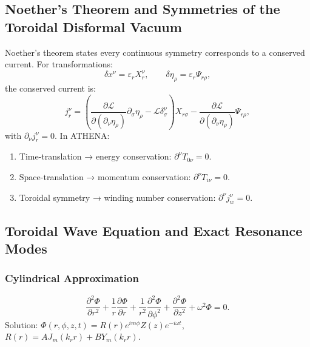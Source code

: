\documentclass[12pt, a4paper]{article}
\begin{document}
\subsection{Noether's Theorem and Symmetries of the Toroidal Disformal Vacuum}
\label{sec:noether}
Noether's theorem states every continuous symmetry corresponds to a conserved current. For transformations:
\begin{equation}
\delta x^\nu = \varepsilon_r X_r^\nu, \qquad \delta \eta_\rho = \varepsilon_r \Psi_{r\rho},
\label{eq:noether_trans}
\end{equation}
the conserved current is:
\begin{equation}
j_r^\nu = \left( \frac{\partial \mathcal{L}}{\partial(\partial_\nu \eta_\rho)} \partial_\sigma \eta_\rho - \mathcal{L} \delta_\sigma^\nu \right) X_{r\sigma} - \frac{\partial \mathcal{L}}{\partial(\partial_\nu \eta_\rho)} \Psi_{r\rho},
\label{eq:noether_current}
\end{equation}
with $\partial_\nu j_r^\nu = 0$. In ATHENA:
\begin{enumerate}
    \item Time-translation → energy conservation: $\partial^\nu T_{0\nu} = 0$.
    \item Space-translation → momentum conservation: $\partial^\nu T_{i\nu} = 0$.
    \item Toroidal symmetry → winding number conservation: $\partial^\nu j_w^\nu = 0$.
\end{enumerate}

\subsection{Toroidal Wave Equation and Exact Resonance Modes}
\subsubsection{Cylindrical Approximation}
\begin{equation}
\frac{\partial^2 \Phi}{\partial r^2} + \frac{1}{r} \frac{\partial \Phi}{\partial r} + \frac{1}{r^2} \frac{\partial^2 \Phi}{\partial \phi^2} + \frac{\partial^2 \Phi}{\partial z^2} + \omega^2 \Phi = 0.
\label{eq:cylindrical_wave}
\end{equation}
Solution: $\Phi(r,\phi,z,t) = R(r) e^{im\phi} Z(z) e^{-i\omega t}$, $R(r) = A J_m(k_r r) + B Y_m(k_r r)$.
\end{document}
